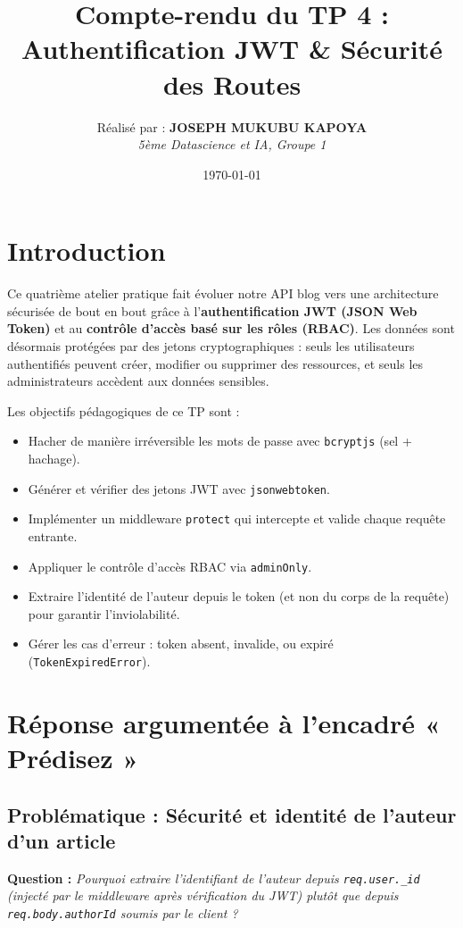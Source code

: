 \documentclass[12pt, a4paper]{article}
\title{\textbf{Compte-rendu du TP 4 : Authentification JWT \& Sécurité des Routes}}
\author{
    Réalisé par : \textbf{JOSEPH MUKUBU KAPOYA} \\
    \textit{5ème Datascience et IA, Groupe 1}
}
\date{\today}
\begin{document}
\maketitle

\section*{Introduction}
Ce quatrième atelier pratique fait évoluer notre API blog vers une architecture sécurisée de bout en bout grâce à l'\textbf{authentification JWT (JSON Web Token)} et au \textbf{contrôle d'accès basé sur les rôles (RBAC)}. Les données sont désormais protégées par des jetons cryptographiques : seuls les utilisateurs authentifiés peuvent créer, modifier ou supprimer des ressources, et seuls les administrateurs accèdent aux données sensibles.

Les objectifs pédagogiques de ce TP sont :
\begin{itemize}
    \item Hacher de manière irréversible les mots de passe avec \texttt{bcryptjs} (sel + hachage).
    \item Générer et vérifier des jetons JWT avec \texttt{jsonwebtoken}.
    \item Implémenter un middleware \texttt{protect} qui intercepte et valide chaque requête entrante.
    \item Appliquer le contrôle d'accès RBAC via \texttt{adminOnly}.
    \item Extraire l'identité de l'auteur depuis le token (et non du corps de la requête) pour garantir l'inviolabilité.
    \item Gérer les cas d'erreur : token absent, invalide, ou expiré (\texttt{TokenExpiredError}).
\end{itemize}

\section{Réponse argumentée à l'encadré « Prédisez »}

\subsection*{Problématique : Sécurité et identité de l'auteur d'un article}
\textbf{Question :} \textit{Pourquoi extraire l'identifiant de l'auteur depuis \texttt{req.user.\_id} (injecté par le middleware après vérification du JWT) plutôt que depuis \texttt{req.body.authorId} soumis par le client ?}
\end{document}
